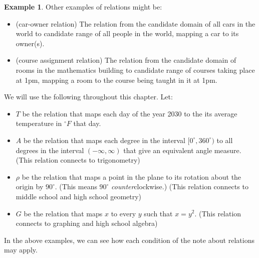 \documentclass[11pt]{article}
\newcommand\degrees{^\circ}
\theoremstyle{definition}
\newtheorem{example}[theorem]{Example}
\begin{document}
\begin{example}
\label{ex: relations}
Other examples of relations might be:


	\begin{itemize}
	\item (car-owner relation) The relation from the candidate domain of all cars in the world to candidate range of all people in the world, mapping a car to its owner(s).
	\item (course assignment relation) The relation from the candidate domain of rooms in the mathematics building to candidate range of courses taking place at 1pm, mapping a room to the course being taught in it at 1pm.
	\end{itemize}
	
	We will use the following throughout this chapter.  Let: 
	\begin{itemize}
	\item $T$ be the relation that maps each day of the year 2030 to the its average temperature in $\degrees F$ that day. 

	\item $A$ be the relation that maps each degree in the interval $[0\degrees, 360\degrees)$ to all degrees in the interval $(-\infty,\infty)$ that give an equivalent angle measure. (This relation connects to trigonometry)

	\item $\rho$ be the relation that maps a point in the plane to its rotation about the origin by $90\degrees$. (This means $90\degrees$ {\it counter}clockwise.) (This relation connects to middle school and high school geometry)

	\item $G$ be the relation that maps $x$ to every $y$ such that $x=y^2$. (This relation connects to graphing and high school algebra)
	\end{itemize}
\end{example} 


In the above examples, we can see how each condition of the note about relations may apply.
\end{document}
